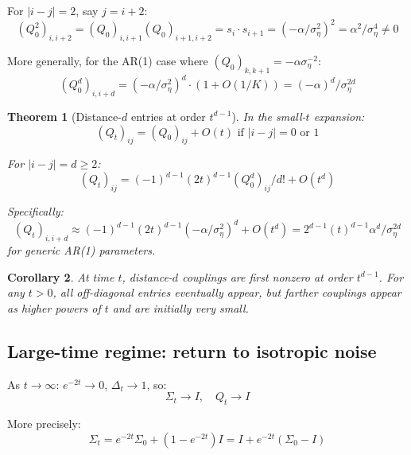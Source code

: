 \documentclass[11pt,a4paper]{article}
\theoremstyle{plain}
\newtheorem{theorem}{Theorem}[section]
\newtheorem{corollary}[theorem]{Corollary}
\theoremstyle{definition}
\newcommand{\Sig}{\Sigma}
\newcommand{\Prec}{Q}
\newcommand{\delt}{\Delta_t}
\begin{document}
For $|i-j| = 2$, say $j = i+2$:
\begin{equation}
(\Prec_0^2)_{i,i+2} = (\Prec_0)_{i,i+1}(\Prec_0)_{i+1,i+2} = s_i \cdot s_{i+1} = (-\alpha/\sigma_\eta^2)^2 = \alpha^2/\sigma_\eta^4 \ne 0
\end{equation}

More generally, for the AR(1) case where $(\Prec_0)_{k,k+1} = -\alpha\sigma_\eta^{-2}$:
\begin{equation}
(\Prec_0^d)_{i,i+d} = (-\alpha/\sigma_\eta^2)^d \cdot (1 + O(1/K)) = (-\alpha)^d/\sigma_\eta^{2d}
\end{equation}

\begin{theorem}[Distance-$d$ entries at order $t^{d-1}$]
In the small-$t$ expansion:
\begin{equation}
(\Prec_t)_{ij} = (\Prec_0)_{ij} + O(t)\text{ if } |i-j| = 0 \text{ or } 1
\end{equation}

For $|i-j| = d \ge 2$:
\begin{equation}
(\Prec_t)_{ij} = (-1)^{d-1} (2t)^{d-1} (\Prec_0^d)_{ij}/d! + O(t^d)
\end{equation}

Specifically:
\begin{equation}
(\Prec_t)_{i,i+d} \approx (-1)^{d-1}(2t)^{d-1}(-\alpha/\sigma_\eta^2)^d + O(t^d) = 2^{d-1}(t)^{d-1}\alpha^d/\sigma_\eta^{2d}
\end{equation}
for generic AR(1) parameters.
\end{theorem}

\begin{corollary}
At time $t$, distance-$d$ couplings are first nonzero at order $t^{d-1}$. For any $t > 0$, all off-diagonal entries eventually appear, but farther couplings appear as higher powers of $t$ and are initially very small.
\end{corollary}

\subsection{Large-time regime: return to isotropic noise}
\label{sec:large-time}

As $t \to \infty$: $e^{-2t} \to 0$, $\delt \to 1$, so:
\begin{equation}
\Sig_t \to I, \quad \Prec_t \to I
\end{equation}

More precisely:
\begin{equation}
\Sig_t = e^{-2t}\Sig_0 + (1-e^{-2t})I = I + e^{-2t}(\Sig_0 - I)
\end{equation}
\end{document}

